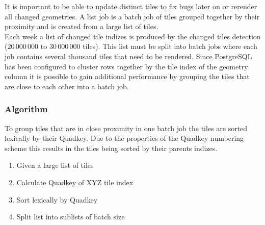 \noindent\begin{minipage}[t]{0.68\linewidth}
    \vspace{0pt}
    It is important to be able to update distinct tiles to fix bugs later on or rerender all changed geometries. A list job is a batch job of tiles grouped together by their proximity and is created from a large list of tiles.\\
    
    Each week a list of changed tile indizes is produced by the changed tiles detection ($20\,000\,000$ to $30\,000\,000$ tiles). This list must be split into batch jobs where each job contains several thousand tiles that need to be rendered. Since PostgreSQL has been configured to cluster rows together by the tile index of the geometry column it is possible to gain additional performance by grouping the tiles that are close to each other into a batch job.

    \subsubsection*{Algorithm}
    
    To group tiles that are in close proximity in one batch job the tiles are sorted lexically by their Quadkey\cite{bing_quad_key}. Due to the properties of the Quadkey numbering scheme this results in the tiles being sorted by their parents indizes.
    
    \begin{enumerate}  
        \item Given a large list of tiles
        \item Calculate Quadkey of XYZ tile index
        \item Sort lexically by Quadkey
        \item Split list into sublists of batch size
    \end{enumerate}
\end{minipage}
\hfill
